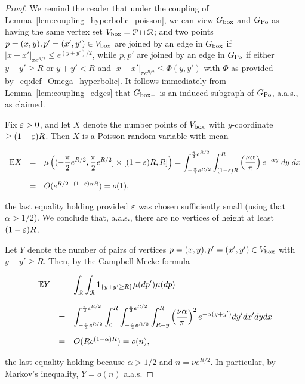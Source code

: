 \begin{proof}
We remind the reader that under the coupling of Lemma~\ref{lem:coupling_hyperbolic_poisson}, 
we can view $G_{\mathrm{box}}$ and $G_{{\mathrm{Po}}}$ as having the same vertex set $V_{\text{box}} = {\mathcal P} \cap {\mathcal R}$; and 
two points $p = (x,y), p' = (x',y') \in V_{\text{box}}$ are joined by an edge in $G_{\mathrm{box}}$ if 
$|x-x'|_{\pi e^{R/2}} \leq e^{(y+y')/2}$, while $p,p'$ are joined by an edge in $G_{{\mathrm{Po}}}$ 
if either $y+y'\geq R$ or $y+y'<R$ and $|x-x'|_{\pi e^{R/2}} \leq \Phi(y,y')$ with $\Phi$ as provided by~\eqref{eq:def_Omega_hyperbolic}.
It follows immediately from Lemma~\ref{lem:coupling_edges} that $G_{\mathrm{box}-}$ is an induced subgraph of $G_{{\mathrm{Po}}}$, a.a.s., as claimed.

Fix $\varepsilon > 0$, and let $X$ denote the number points of $V_{\text{box}}$ with $y$-coordinate $\geq (1-\varepsilon) R$. 
Then $X$ is a Poisson random variable with mean

$$ \begin{array}{rcl} 
{\mathbb E} X 
& = & \displaystyle \mu\left( (-\frac{\pi}{2} e^{R/2},\frac{\pi}{2} e^{R/2}] \times [(1-\varepsilon) R,R] \right)
= \int_{-\frac{\pi}{2} e^{R/2}}^{\frac{\pi}{2} e^{R/2}}\int_{(1-\varepsilon)R}^R \left(\frac{\nu\alpha}{\pi}\right) e^{-\alpha y}\;dy\;dx \\[4ex]
& = & O( e^{R/2-(1-\varepsilon)\alpha R} ) = o(1), 
\end{array} $$

\noindent
the last equality holding provided $\varepsilon$ was chosen sufficiently small (using that $\alpha > 1/2$).
We conclude that, a.a.s., there are no vertices of height at least 
$(1-\varepsilon) R$.

Let $Y$ denote the number of pairs of vertices $p = (x,y), p'=(x',y') \in V_{\text{box}}$ with $y+y' \geq R$.
Then, by the Campbell-Mecke formula

$$ \begin{array}{rcl} {\mathbb E} Y 
& = & \displaystyle
\int_{{\mathcal R}}\int_{{\mathcal R}} 1_{\{y+y'\geq R\}} \mu(dp')\mu(dp) \\[4ex]
& = & \displaystyle
\int_{-\frac{\pi}{2}e^{R/2}}^{\frac{\pi}{2}e^{R/2}}\int_0^R
\int_{-\frac{\pi}{2}e^{R/2}}^{\frac{\pi}{2}e^{R/2}}\int_{R-y}^R \left(\frac{\nu\alpha}{\pi}\right)^2 e^{-\alpha(y+y')}dy'dx'dydx \\[4ex]
& = & O( R e^{(1-\alpha)R} ) = o( n ),
\end{array} $$

\noindent
the last equality holding because $\alpha > 1/2$ and $n = \nu e^{R/2}$.
In particular, by Markov's inequality, $Y = o(n)$ a.a.s.


\end{proof}
